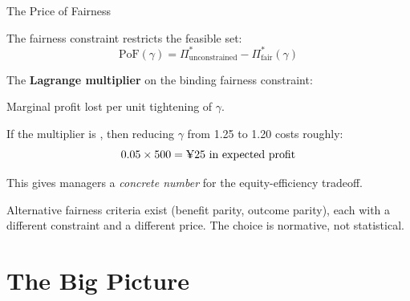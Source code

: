 \documentclass[aspectratio=169, 11pt, handout]{beamer}
\begin{document}
 
\begin{frame}{The Price of Fairness}
 
The fairness constraint restricts the feasible set:
\[
\text{PoF}(\gamma) = \Pi^*_{\text{unconstrained}} - \Pi^*_{\text{fair}}(\gamma)
\]
 
\pause
\bigskip
 
The \textbf{Lagrange multiplier} on the binding fairness constraint:
 
\medskip
 
Marginal profit lost per unit tightening of $\gamma$.
 
\pause
\bigskip
 
If the multiplier is , then reducing $\gamma$ from 1.25 to 1.20 costs roughly:
\[
0.05 \times 500 = \text{\textyen}25 \text{ in expected profit}
\]
 
\medskip
 
This gives managers a \emph{concrete number} for the equity-efficiency tradeoff.
 
\pause
\bigskip
 
Alternative fairness criteria exist (benefit parity, outcome parity), each with a different constraint and a different price. The choice is normative, not statistical.
 
\end{frame}
 
 
\section{The Big Picture}
 
\end{document}
